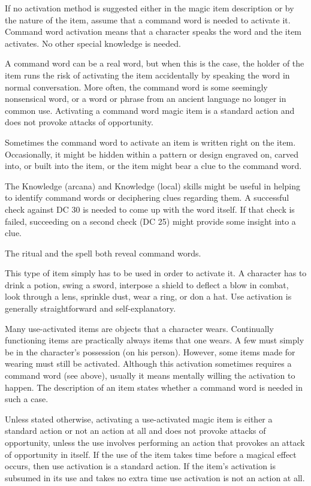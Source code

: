  If no activation method is suggested either in the magic item description or by the nature of the item, assume that a command word is needed to activate it. Command word activation means that a character speaks the word and the item activates. No other special knowledge is needed.

A command word can be a real word, but when this is the case, the holder of the item runs the risk of activating the item accidentally by speaking the word in normal conversation. More often, the command word is some seemingly nonsensical word, or a word or phrase from an ancient language no longer in common use. Activating a command word magic item is a standard action and does not provoke attacks of opportunity.

Sometimes the command word to activate an item is written right on the item. Occasionally, it might be hidden within a pattern or design engraved on, carved into, or built into the item, or the item might bear a clue to the command word.

The Knowledge (arcana) and Knowledge (local) skills might be useful in helping to identify command words or deciphering clues regarding them. A successful check against DC 30 is needed to come up with the word itself. If that check is failed, succeeding on a second check (DC 25) might provide some insight into a clue.

The  ritual and the  spell both reveal command words.

 This type of item simply has to be used in order to activate it. A character has to drink a potion, swing a sword, interpose a shield to deflect a blow in combat, look through a lens, sprinkle dust, wear a ring, or don a hat. Use activation is generally straightforward and self-explanatory.

Many use-activated items are objects that a character wears. Continually functioning items are practically always items that one wears. A few must simply be in the character's possession (on his person). However, some items made for wearing must still be activated. Although this activation sometimes requires a command word (see above), usually it means mentally willing the activation to happen. The description of an item states whether a command word is needed in such a case.

Unless stated otherwise, activating a use-activated magic item is either a standard action or not an action at all and does not provoke attacks of opportunity, unless the use involves performing an action that provokes an attack of opportunity in itself. If the use of the item takes time before a magical effect occurs, then use activation is a standard action. If the item's activation is subsumed in its use and takes no extra time use activation is not an action at all.

